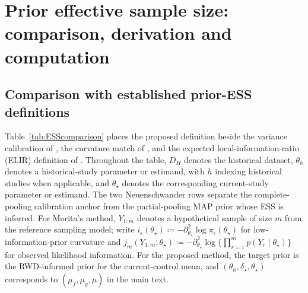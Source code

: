 \section{Prior effective sample size: comparison, derivation and computation}\label{sec:B}

\subsection{Comparison with established prior-ESS definitions}\label{sec:B.1}
Table~\ref{tab:ESScomparison} places the proposed definition beside the variance calibration of \citet{Neuenschwander2010MAP}, the curvature match of \citet{Morita2008ESS}, and the expected local-information-ratio (ELIR) definition of \citet{neuenschwander2020}. Throughout the table, $D_H$ denotes the historical dataset, $\theta_h$ denotes a historical-study parameter or estimand, with $h$ indexing historical studies when applicable, and $\theta_\star$ denotes the corresponding current-study parameter or estimand. The two Neuenschwander rows separate the complete-pooling calibration anchor from the partial-pooling MAP prior whose ESS is inferred. For Morita's method, $Y_{1:m}$ denotes a hypothetical sample of size $m$ from the reference sampling model; write $i_\epsilon(\theta_\star)\coloneqq-\partial_{\theta_\star}^2\log\pi_\epsilon(\theta_\star)$ for low-information-prior curvature and $j_m(Y_{1:m};\theta_\star)\coloneqq-\partial_{\theta_\star}^2\log\{\prod_{r=1}^m p(Y_r\mid\theta_\star)\}$ for observed likelihood information. For the proposed method, the target prior is the RWD-informed prior for the current-control mean, and $(\theta_h,\delta_\star,\theta_\star)$ corresponds to $(\mu_f,\mu_g,\mu)$ in the main text.


